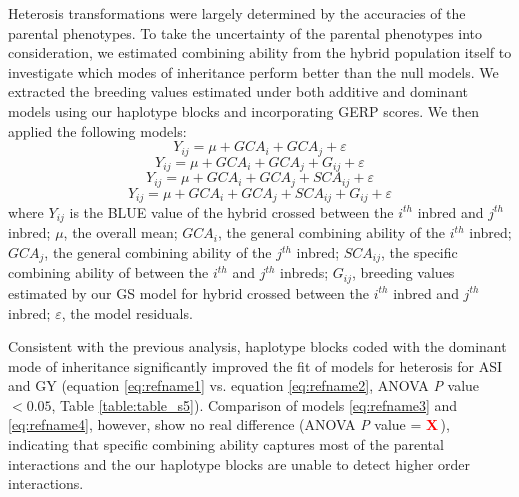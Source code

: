 \documentclass[9pt,twocolumn,twoside]{gsajnl}
\newcommand{\X}{\textcolor{red}{\bf X\,}}
\begin{document}
Heterosis transformations were largely determined by the accuracies of the parental phenotypes. 
To take the uncertainty of the parental phenotypes into consideration, we estimated  combining ability from the hybrid population itself to investigate which modes of inheritance perform better than the null models. 
We extracted the breeding values estimated under both additive and dominant models using our haplotype blocks and incorporating GERP scores. 
We then applied the following models:
\begin{equation}
Y_{ij} = \mu + GCA_{i} + GCA_{j} + \varepsilon
\label{eq:refname1}
\end{equation}
\begin{equation}
Y_{ij} = \mu + GCA_{i} + GCA_{j} +  G_{ij} + \varepsilon
\label{eq:refname2}
\end{equation}
\begin{equation}
Y_{ij} = \mu + GCA_{i} + GCA_{j} + SCA_{ij} + \varepsilon
\label{eq:refname3}
\end{equation}
\begin{equation}
Y_{ij} = \mu + GCA_{i} + GCA_{j} + SCA_{ij} + G_{ij} + \varepsilon
\label{eq:refname4}
\end{equation}
where 
$Y_{ij}$ is the BLUE value of the hybrid crossed between the $i^{th}$ inbred and $j^{th}$ inbred; 
$\mu$, the overall mean; 
$GCA_{i}$, the general combining ability of the $i^{th}$ inbred;
$GCA_{j}$, the general combining ability of the $j^{th}$ inbred;
$SCA_{ij}$, the specific combining ability of between the $i^{th}$ and $j^{th}$ inbreds;
$G_{ij}$, breeding values estimated by our GS model for hybrid crossed between the $i^{th}$ inbred and $j^{th}$ inbred; 
$\varepsilon$, the model residuals.

Consistent with the previous analysis, haplotype blocks coded with the dominant mode of inheritance significantly improved the fit of models for heterosis for ASI and GY (equation \ref{eq:refname1} vs. equation \ref{eq:refname2}, ANOVA \emph{P} value $<0.05$, Table \ref{table:table_s5}). 
Comparison of models \ref{eq:refname3} and \ref{eq:refname4}, however, show no real difference (ANOVA \emph{P} value = \X), indicating that specific combining ability captures most of the parental interactions and the our haplotype blocks are unable to detect higher order interactions.  
\end{document}
